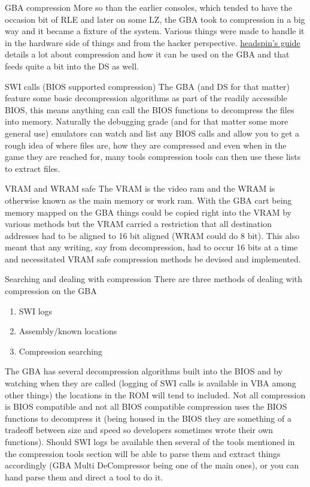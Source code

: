 \documentclass[
]{book}
\providecommand{\tightlist}{%
  \setlength{\itemsep}{0pt}\setlength{\parskip}{0pt}}
\begin{document}
GBA compression More so than the earlier consoles, which tended to have the occasion bit of RLE and later on some LZ, the GBA took to compression in a big way and it became a fixture of the system. Various things were made to handle it in the hardware side of things and from the hacker perspective. \href{http://members.iinet.net.au/~freeaxs/gbacomp/}{headspin's guide} details a lot about compression and how it can be used on the GBA and that feeds quite a bit into the DS as well.

SWI calls (BIOS supported compression) The GBA (and DS for that matter) feature some basic decompression algorithms as part of the readily accessible BIOS, this means anything can call the BIOS functions to decompress the files into memory. Naturally the debugging grade (and for that matter some more general use) emulators can watch and list any BIOS calls and allow you to get a rough idea of where files are, how they are compressed and even when in the game they are reached for, many tools compression tools can then use these lists to extract files.

VRAM and WRAM safe The VRAM is the video ram and the WRAM is otherwise known as the main memory or work ram. With the GBA cart being memory mapped on the GBA things could be copied right into the VRAM by various methods but the VRAM carried a restriction that all destination addresses had to be aligned to 16 bit aligned (WRAM could do 8 bit). This also meant that any writing, say from decompression, had to occur 16 bits at a time and necessitated VRAM safe compression methods be devised and implemented.

Searching and dealing with compression There are three methods of dealing with compression on the GBA

\begin{enumerate}
\def\labelenumi{\arabic{enumi}.}
\tightlist
\item
  SWI logs
\item
  Assembly/known locations
\item
  Compression searching
\end{enumerate}

The GBA has several decompression algorithms built into the BIOS and by watching when they are called (logging of SWI calls is available in VBA among other things) the locations in the ROM will tend to included. Not all compression is BIOS compatible and not all BIOS compatible compression uses the BIOS functions to decompress it (being housed in the BIOS they are something of a tradeoff between size and speed so developers sometimes wrote their own functions). Should SWI logs be available then several of the tools mentioned in the compression tools section will be able to parse them and extract things accordingly (GBA Multi DeCompressor being one of the main ones), or you can hand parse them and direct a tool to do it.
\end{document}
